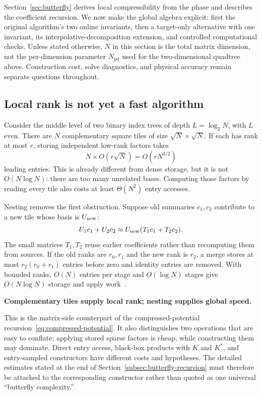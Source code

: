 \documentclass[11pt,a4paper]{article}
\newcommand{\takeaway}[1]{\begin{center}\colorbox{light}{\parbox{0.95\linewidth}{\vspace{5pt}\centering\textbf{#1}\vspace{5pt}}}\end{center}}
\begin{document}
Section~\ref{sec:butterfly} derives local compressibility from the phase and describes the coefficient recursion. We now make the global algebra explicit: first the original algorithm's two online invariants, then a target-only alternative with one invariant, its interpolative-decomposition extension, and controlled computational checks. Unless stated otherwise, $N$ in this section is the total matrix dimension, not the per-dimension parameter $N_{\mathrm{pd}}$ used for the two-dimensional quadtree above. Construction cost, solve diagnostics, and physical accuracy remain separate questions throughout.

\subsection{Local rank is not yet a fast algorithm}
Consider the middle level of two binary index trees of depth $L=\log_2N$, with $L$ even. There are $N$ complementary square tiles of size $\sqrt N\times\sqrt N$. If each has rank at most $r$, storing independent low-rank factors takes
\begin{equation}
 N\times O(r\sqrt N)=O(rN^{3/2})
 \label{eq:middlecost}
\end{equation}
leading entries. This is already different from dense storage, but it is not $O(N\log N)$: there are too many unrelated bases. Computing those factors by reading every tile also costs at least $\Theta(N^2)$ entry accesses.

Nesting removes the first obstruction. Suppose old summaries $c_1,c_2$ contribute to a new tile whose basis is $U_{\rm new}$:
\begin{equation}
 U_1c_1+U_2c_2
 \approx U_{\rm new}(T_1c_1+T_2c_2).
 \label{eq:transfer}
\end{equation}
The small matrices $T_1,T_2$ reuse earlier coefficients rather than recomputing them from sources. If the old ranks are $r_0,r_1$ and the new rank is $r_2$, a merge stores at most $r_2(r_0+r_1)$ entries before zero and identity entries are removed. With bounded ranks, $O(N)$ entries per stage and $O(\log N)$ stages give $O(N\log N)$ storage and apply work~\cite{li2015butterfly}.
\takeaway{Complementary tiles supply local rank; nesting supplies global speed.}

This is the matrix-side counterpart of the compressed-potential recursion~\eqref{eq:compressed-potential}. It also distinguishes two operations that are easy to conflate: applying stored sparse factors is cheap, while constructing them may dominate. Direct entry access, black-box products with $K$ and $K^*$, and entry-sampled constructors have different costs and hypotheses. The detailed estimates stated at the end of Section~\ref{subsec:butterfly-recursion} must therefore be attached to the corresponding constructor rather than quoted as one universal ``butterfly complexity.''
\end{document}
